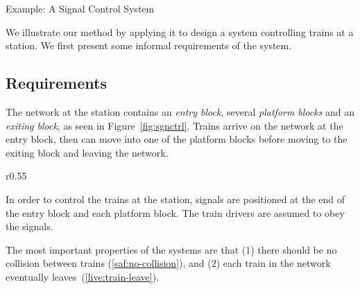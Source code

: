 \newcommand{\PREAMBLE}

\section{Example: A Signal Control System}
\label{sec:example}

We illustrate our method by applying it to design a system controlling
trains at a station.  We first present some informal requirements of
the system.

\subsection{Requirements}
\label{sec:requirements}

The network at the station contains an \emph{entry block}, several
\emph{platform blocks} and an \emph{exiting block}, as seen in
Figure~\ref{fig:sgnctrl}.  Trains arrive on the network at the entry
block, then can move into one of the platform blocks before moving to
the exiting block and leaving the network.
\begin{wrapfigure}{r}{0.55\linewidth}
  \centering 
  \caption{A signal control system}
  \label{fig:sgnctrl}
\end{wrapfigure}
\begin{requirements}
\end{requirements}

In order to control the trains at the station, signals are positioned
at the end of the entry block and each platform block.  The
train drivers are assumed to obey the signals.
\begin{requirements}
  \ReqSpacing
  \ReqSpacing
   \ReqSpacing
\end{requirements}

The most important properties of the systems are that (1) there should be
no collision between trains (\ref{saf:no-collision}), and (2) each train in the network eventually
leaves~(\ref{live:train-leave}).
\begin{requirements}
  \ReqSpacing
\end{requirements}

